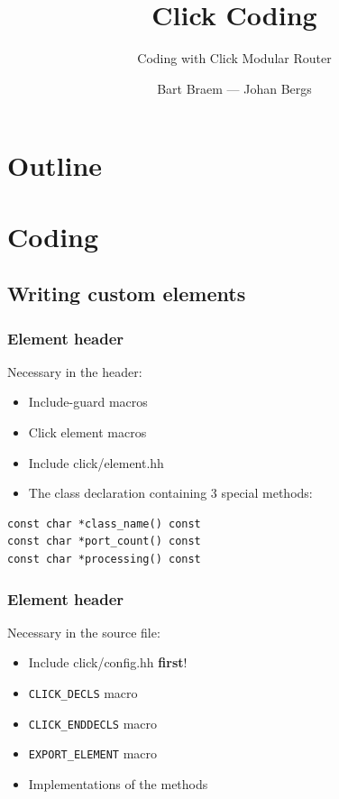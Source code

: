 \documentclass{beamer}
\title{Click Coding}
\subtitle{Coding with Click Modular Router}
\author{Bart Braem --- Johan Bergs}
\institute{University of Antwerp\\iMinds - PATS Research Group}
\date{}
\begin{document}
\lstset{breakatwhitespace=true}
\lstset{language=C++}
\lstset{columns=fullflexible}
\lstset{keepspaces=true}
\lstset{breaklines=true,
        tabsize=3, 
        showstringspaces=false,
extendedchars=\true,
basicstyle=\ttfamily}

\begin{frame}[t]
\titlepage
\end{frame}


\section*{Outline}


\section{Coding}
\subsection{Writing custom elements} %
\label{sub:writing_custom_elements}

\begin{frame}[fragile]
\frametitle{Element header}
Necessary in the header:
\begin{itemize}
	\item Include-guard macros
	\item Click element macros
	\item Include click/element.hh
	\item The class declaration containing 3 special methods:
\end{itemize}
\begin{lstlisting}
const char *class_name() const
const char *port_count() const
const char *processing() const
\end{lstlisting}
\end{frame}

\begin{frame}[fragile]
\frametitle{Element header}
Necessary in the source file:
\begin{itemize}
	\item Include click/config.hh \textbf{first}!
	\item \lstinline!CLICK_DECLS! macro
	\item \lstinline!CLICK_ENDDECLS! macro
	\item \lstinline!EXPORT_ELEMENT! macro
	\item Implementations of the methods
\end{itemize}
\end{frame}
\end{document}
